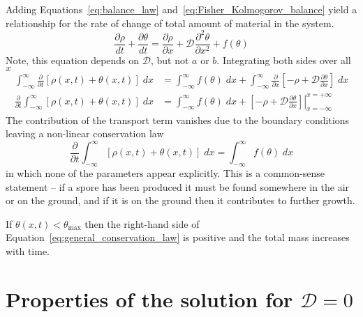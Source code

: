 \documentclass[12pt]{amsart}
\begin{document}
Adding Equations~\ref{eq:balance_law}
and~\ref{eq:Fisher_Kolmogorov_balance} yield a relationship for
the rate of change of total amount of material in the system.
\begin{equation}
  \frac{\partial\rho}{dt} + \frac{\partial\theta}{dt} =
  \frac{\partial \rho}{\partial x} +
  \mathcal{D}\frac{\partial^2\theta}{\partial x^2} +
  f(\theta)
\end{equation}
Note, this equation depends on $\mathcal{D}$,
but not $a$ or $b$.  Integrating both sides over all $x$
\begin{align}
  \int_{-\infty}^{\infty} \frac{\partial}{\partial t} \left[\rho(x,
    t)+\theta(x,t)\right]\; dx &=
  \int_{-\infty}^{\infty} f(\theta) \; dx +
  \int_{-\infty}^{\infty} \frac{\partial}{\partial x} \left[-\rho +
    \mathcal{D}\frac{\partial \theta}{\partial x}\right]\; dx \\
  \frac{\partial}{\partial t} \int_{-\infty}^{\infty}
  \left[\rho(x, t)+\theta(x,t)\right]\; dx &=
  \int_{-\infty}^{\infty} f(\theta) \; dx + \left.\left[-\rho +
    \mathcal{D}\frac{\partial \theta}{\partial
      x}\right]\right|_{x=-\infty}^{x=+\infty}
 \end{align}
The contribution of the transport term vanishes due to the boundary
conditions leaving a non-linear conservation law
\begin{equation}
  \frac{\partial}{\partial t} \int_{-\infty}^{\infty}
  \left[\rho(x, t)+\theta(x,t)\right]\; dx = \int_{-\infty}^{\infty}
  f(\theta) \; dx
  \label{eq:general_conservation_law}
\end{equation}
in which none of the parameters appear explicitly.  This is a
common-sense statement -- if a spore has been produced it must be
found somewhere in the air or on the ground, and if it is on the
ground then it contributes to further growth.

If $\theta(x, t) < \theta_{\max}$ then the right-hand side of
Equation~\ref{eq:general_conservation_law} is positive and the total
mass increases with time.


\section{Properties of the solution for $\mathcal{D}=0$}
\end{document}
